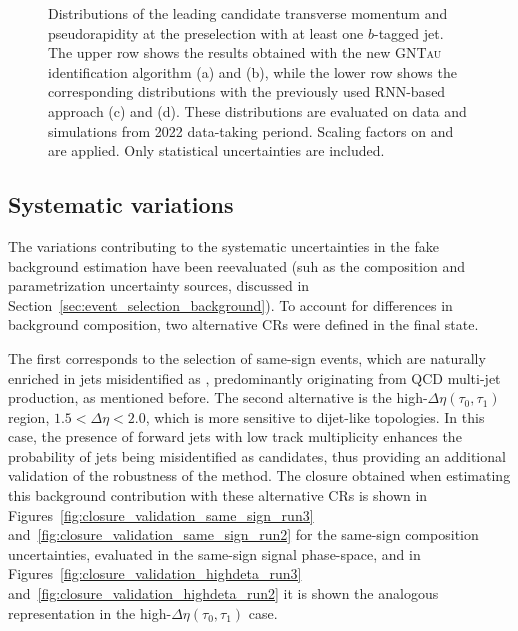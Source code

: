 \begin{figure}[htbp]
    \caption{Distributions of the leading \tauhad candidate transverse momentum and pseudorapidity at the \ttH preselection with at least one $b$-tagged jet. 
    The upper row shows the results obtained with the new \textsc{GNTau} identification algorithm (a) and (b), while the lower row shows the corresponding distributions with the previously used RNN-based approach (c) and (d). These distributions are evaluated on data and simulations from 2022 data-taking periond. Scaling factors on \ztautau and \ttbar are applied. Only statistical uncertainties are included.}
    \label{run2_fakes_comparison}
\end{figure}

\subsection{Systematic variations}

The variations contributing to the systematic uncertainties in the fake \tauhad background estimation have been reevaluated (suh as the composition and parametrization uncertainty sources,  discussed in Section~\ref{sec:event_selection_background}).
To account for differences in background composition, two alternative CRs were defined in the \tauhadhad final state.  

The first corresponds to the selection of same-sign events, which are naturally enriched in jets misidentified as \tauhad, predominantly originating from QCD multi-jet production, as mentioned before.
The second alternative is the high-$\Delta\eta(\tau_0,\tau_1)$ region, $1.5 < \Delta\eta < 2.0$, which is more sensitive to dijet-like topologies. In this case, the presence of forward jets with low track multiplicity enhances the probability of jets being misidentified as \tauhad candidates, thus providing an additional validation of the robustness of the method. The closure obtained when estimating this background contribution with these alternative CRs is shown in Figures~\ref{fig:closure_validation_same_sign_run3} and~\ref{fig:closure_validation_same_sign_run2} for the same-sign composition uncertainties, evaluated in the same-sign \tauhadhad signal phase-space, and in Figures~\ref{fig:closure_validation_highdeta_run3} and~\ref{fig:closure_validation_highdeta_run2} it is shown the analogous representation in the high-$\Delta \eta (\tau_0,\tau_1)$ case.

